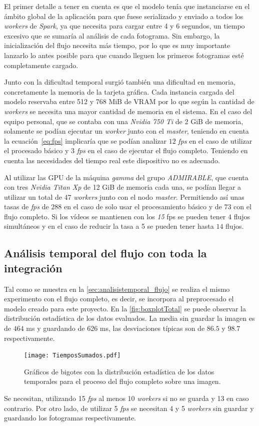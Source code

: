 El primer detalle a tener en cuenta es que el modelo tenía que instanciarse en el ámbito global de la aplicación para que fuese serializado y enviado a todos los \textit{workers} de \textit{Spark}, ya que necesita para cargar entre 4 y 6 segundos, un tiempo excesivo que se sumaría al análisis de cada fotograma. Sin embargo, la inicialización del flujo necesita más tiempo, por lo que es muy importante lanzarlo lo antes posible para que cuando lleguen los primeros fotogramas esté completamente cargado.

Junto con la dificultad temporal surgió también una dificultad en memoria, concretamente la memoria de la tarjeta gráfica. Cada instancia cargada del modelo reservaba entre 512 y 768 MiB de VRAM por lo que según la cantidad de \textit{workers} se necesita una mayor cantidad de memoria en el sistema. En el caso del equipo personal, que se contaba con una \textit{Nvidia 750 Ti} de 2 GiB de memoria, solamente se podían ejecutar un \textit{worker} junto con el \textit{master}, teniendo en cuenta la ecuación~\ref{eq:fps} implicaría que se podían analizar $12$ \textit{fps} en el caso de utilizar el procesado básico y $3$ \textit{fps} en el caso de ejecutar el flujo completo. Teniendo en cuenta las necesidades del tiempo real este dispositivo no es adecuado.

Al utilizar las GPU de la máquina \textit{gamma} del grupo \textit{ADMIRABLE}, que cuenta con tres \textit{Nvidia Titan Xp} de 12 GiB de memoria cada una, se podían llegar a utilizar un total de 47 \textit{workers} junto con el nodo \textit{master}. Permitiendo así unas tasas de \textit{fps} de $288$ en el caso de solo usar el procesamiento básico y de $73$ con el flujo completo. Si los vídeos se mantienen con los \textit{15} fps se pueden tener $4$ flujos simultáneos y en el caso de reducir la tasa a 5 se pueden tener hasta $14$ flujos.


\subsection{Análisis temporal del flujo con toda la integración}\label{sec:analisistemporal}

Tal como se muestra en la \autoref{sec:analisistemporal_flujo} se realiza el mismo experimento con el flujo completo, es decir, se incorpora al preprocesado el modelo creado para este proyecto. En la \autoref{fig:boxplotTotal} se puede observar la distribución estadística de los datos evaluados. La media sin guardar la imagen es de $464$ ms y guardando de $626$ ms, las desviaciones típicas son de $86.5$ y $98.7$ respectivamente.

\begin{figure}[h]
	\texttt{[image: TiemposSumados.pdf]}
	\caption{Gráficos de bigotes con la distribución estadística de los datos temporales para el proceso del flujo completo sobre una imagen.}
	\label{fig:boxplotTotal}
\end{figure}

Se necesitan, utilizando 15 \textit{fps} al menos 10 \textit{workers} si no se guarda y 13 en caso contrario. Por otro lado, de utilizar 5 \textit{fps} se necesitan 4 y 5 \textit{workers} sin guardar y guardando los fotogramas respectivamente.